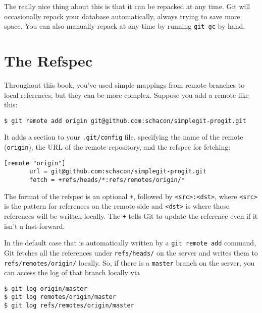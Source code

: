 \documentclass[a4paper]{book}
\newcounter{tab}[chapter]
\begin{document}
The really nice thing about this is that it can be repacked at any time. Git will occasionally repack your database automatically, always trying to save more space. You can also manually repack at any time by running \texttt{git gc} by hand.

\section{The Refspec}

Throughout this book, you've used simple mappings from remote branches to local references; but they can be more complex. Suppose you add a remote like this:

\begin{shaded}\begin{verbatim}
$ git remote add origin git@github.com:schacon/simplegit-progit.git
\end{verbatim}\end{shaded}

It adds a section to your \texttt{.git/config} file, specifying the name of the remote (\texttt{origin}), the URL of the remote repository, and the refspec for fetching:

\begin{shaded}\begin{verbatim}
[remote "origin"]
       url = git@github.com:schacon/simplegit-progit.git
       fetch = +refs/heads/*:refs/remotes/origin/*
\end{verbatim}\end{shaded}

The format of the refspec is an optional \texttt{+}, followed by \texttt{\textless{}src\textgreater{}:\textless{}dst\textgreater{}}, where \texttt{\textless{}src\textgreater{}} is the pattern for references on the remote side and \texttt{\textless{}dst\textgreater{}} is where those references will be written locally. The \texttt{+} tells Git to update the reference even if it isn't a fast-forward.

In the default case that is automatically written by a \texttt{git remote add} command, Git fetches all the references under \texttt{refs/heads/} on the server and writes them to \texttt{refs/remotes/origin/} locally. So, if there is a \texttt{master} branch on the server, you can access the log of that branch locally via

\begin{shaded}\begin{verbatim}
$ git log origin/master
$ git log remotes/origin/master
$ git log refs/remotes/origin/master
\end{verbatim}\end{shaded}
\end{document}
